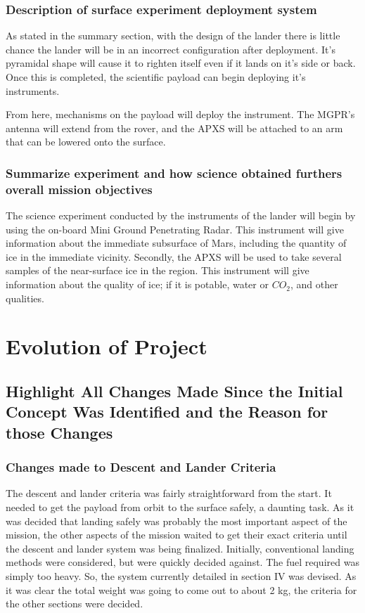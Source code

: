 \documentclass[%
 portrait,
 aapm,
 mph,%
 amsmath,amssymb,
 reprint,%
]{revtex4-2}
\begin{document}
\subsubsection{Description of surface experiment deployment system}
As stated in the summary section, with the design of the lander there is little chance the lander will be in an incorrect configuration after deployment. It's pyramidal shape will cause it to righten itself even if it lands on it's side or back. Once this is completed, the scientific payload can begin deploying it's instruments. 

From here, mechanisms on the payload will deploy the instrument. The MGPR's antenna will extend from the rover, and the APXS will be attached to an arm that can be lowered onto the surface.

\subsubsection{Summarize experiment and how science obtained furthers overall mission objectives}
The science experiment conducted by the instruments of the lander will begin by using the on-board Mini Ground Penetrating Radar. This instrument will give information about the immediate subsurface of Mars, including the quantity of ice in the immediate vicinity. Secondly, the APXS will be used to take several samples of the near-surface ice in the region. This instrument will give information about the quality of ice; if it is potable, water or \begin{math} CO_2 \end{math}, and other qualities. 

\section{\label{sec:level2}Evolution of Project}

\subsection{Highlight All Changes Made Since the Initial Concept Was Identified and the Reason for those Changes}

\subsubsection{Changes made to Descent and Lander Criteria}
The descent and lander criteria was fairly straightforward from the start. It needed to get the payload from orbit to the surface safely, a daunting task. As it was decided that landing safely was probably the most important aspect of the mission, the other aspects of the mission waited to get their exact criteria until the descent and lander system was being finalized. Initially, conventional landing methods were considered, but were quickly decided against. The fuel required was simply too heavy. So, the system currently detailed in section IV was devised. As it was clear the total weight was going to come out to about 2 kg, the criteria for the other sections were decided. 
\end{document}
